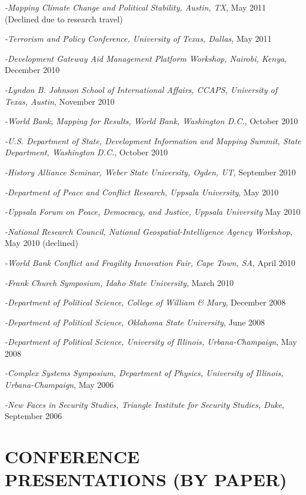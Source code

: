 \documentclass[10pt]{article}
\begin{document}
\begin{etaremune}
\item\textit{-Mapping Climate Change and Political Stability, Austin, TX}, May 2011 (Declined due to research travel)
\item\textit{-Terrorism and Policy Conference, University of Texas, Dallas,} May 2011 %
\item\textit{-Development Gateway Aid Management Platform Workshop, Nairobi, Kenya}, December 2010
\item\textit{-Lyndon B. Johnson School of International Affairs, CCAPS, University of Texas, Austin}, November 2010
\item\textit{-World Bank, Mapping for Results, World Bank, Washington D.C.}, October 2010
\item\textit{-U.S. Department of State, Development Information and Mapping Summit, State Department, Washington D.C.}, October 2010
\item \textit{-History Alliance Seminar, Weber State University, Ogden, UT}, September 2010
\item \textit{-Department of Peace and Conflict Research, Uppsala University}, May 2010
\item \textit{-Uppsala Forum on Peace, Democracy, and Justice, Uppsala University} May 2010
\item \textit{-National Research Council, National Geospatial-Intelligence Agency Workshop}, May 2010 (declined)
\item \textit{-World Bank Conflict and Fragility Innovation Fair, Cape Town, SA}, April 2010
\item \textit{-Frank Church Symposium, Idaho State University}, March 2010
\item \textit{-Department of Political Science, College of William \& Mary}, December 2008
\item \textit{-Department of Political Science, Oklahoma State University}, June 2008
\item \textit{-Department of Political Science, University of Illinois, Urbana-Champaign}, May 2008
\item \textit{-Complex Systems Symposium, Department of Physics, University of Illinois, Urbana-Champaign}, May 2006
\item \textit{-New Faces in Security Studies, Triangle Institute for Security Studies, Duke}, September 2006
\end{etaremune}


\section*{CONFERENCE PRESENTATIONS (BY PAPER)}
\end{document}

